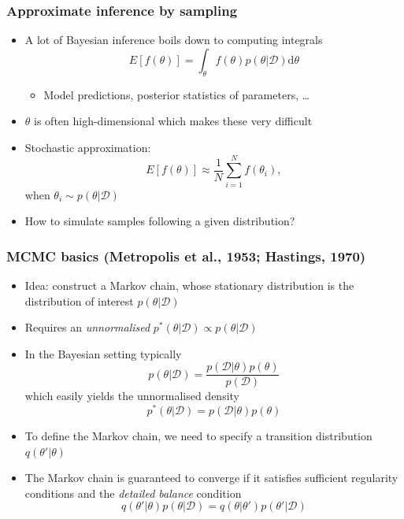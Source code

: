 \documentclass{beamer}
\newcommand{\dataset}{\mathcal{D}}
\newcommand{\parameters}{\theta}
\newcommand{\diff}{\mathrm{d}}
\begin{document}
\begin{frame}
  \frametitle{Approximate inference by sampling}

  \begin{itemize}
  \item A lot of Bayesian inference boils down to computing integrals
    $$ E[f(\parameters)] = \int_\parameters f(\parameters) p(\parameters | \dataset) \diff\parameters $$
    \begin{itemize}
    \item Model predictions, posterior statistics of parameters, \dots
    \end{itemize}
  \item $\parameters$ is often high-dimensional which makes these very difficult
  \item Stochastic approximation:
    $$ E[f(\parameters)] \approx \frac{1}{N} \sum_{i=1}^N f(\parameters_i), $$
    when $\parameters_i \sim p(\parameters | \dataset)$
  \item How to simulate samples following a given distribution?
  \end{itemize}
\end{frame}

\begin{frame}
  \frametitle{MCMC basics (Metropolis et al., 1953; Hastings, 1970)}

  \begin{itemize}
  \item Idea: construct a Markov chain, whose stationary distribution
    is the distribution of interest $p(\parameters | \dataset)$
  \item Requires an \emph{unnormalised} $p^*(\parameters | \dataset) \propto
    p(\parameters | \dataset)$
  \item In the Bayesian setting typically
    $$ p(\parameters | \dataset) = \frac{p(\dataset | \parameters) p(\parameters)}{p(\dataset)} $$
    which easily yields the unnormalised density
    $$ p^*(\parameters | \dataset) = p(\dataset | \parameters) p(\parameters) $$
  \item To define the Markov chain, we need to specify a transition
    distribution $q(\parameters' | \parameters)$
  \item The Markov chain is guaranteed to converge if it satisfies
    sufficient regularity conditions and the \emph{detailed balance}
    condition
    $$ q(\parameters' | \parameters) p(\parameters | \dataset) =
       q(\parameters | \parameters') p(\parameters' | \dataset) $$
  \end{itemize}
\end{frame}
\end{document}
